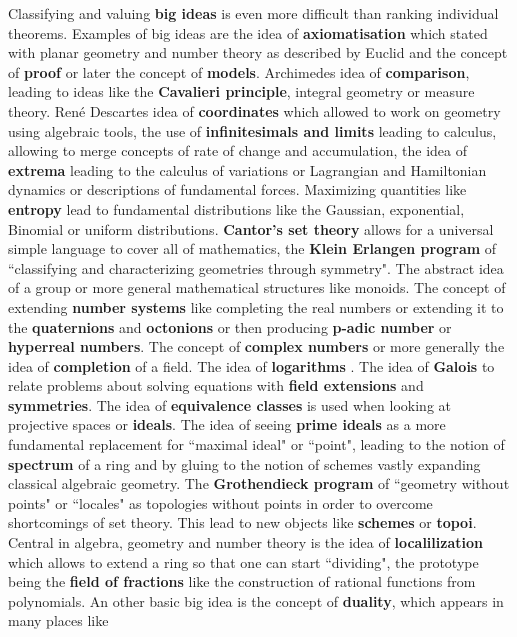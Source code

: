 \documentclass[12pt]{amsart}
\begin{document}
Classifying and valuing {\bf big ideas} is even more difficult than ranking individual
theorems. Examples of big ideas are the idea of {\bf axiomatisation} which stated with 
planar geometry and number theory as described by Euclid and the concept of {\bf proof} 
or later the concept of {\bf models}. 
Archimedes idea of {\bf comparison}, leading to ideas like the {\bf Cavalieri principle}, integral geometry 
or measure theory. Ren\'e Descartes idea of {\bf coordinates} which allowed to work on geometry using algebraic tools,
the use of {\bf infinitesimals and limits} leading to calculus, allowing to merge
concepts of rate of change and accumulation, the idea of {\bf extrema} leading to the calculus
of variations or Lagrangian and Hamiltonian dynamics or descriptions of fundamental forces. Maximizing quantities
like {\bf entropy} lead to fundamental distributions like the Gaussian, exponential, Binomial or uniform distributions. 
{\bf Cantor's set theory} allows for a universal
simple language to cover all of mathematics, the {\bf Klein Erlangen program} of 
``classifying and characterizing geometries through symmetry". The abstract idea of a group
or more general mathematical structures like monoids. The concept of extending {\bf number systems}
like completing the real numbers or extending it to the {\bf quaternions} and {\bf octonions} or then
producing {\bf p-adic number} or {\bf hyperreal numbers}. 
The concept of {\bf complex numbers} or more generally the idea of {\bf completion} of a field.
The idea of {\bf logarithms} \cite{StaudacherBuergi}.
The idea of {\bf Galois} to relate problems about solving equations with {\bf field extensions}
and {\bf symmetries}. The idea of {\bf equivalence classes} is used when looking at projective spaces
or {\bf ideals}. The idea of seeing {\bf prime ideals} as a more fundamental replacement for ``maximal ideal" or 
``point", leading to the notion of {\bf spectrum} of a ring and by gluing to the notion of schemes vastly expanding
classical algebraic geometry.  The {\bf Grothendieck program} of ``geometry without points" or ``locales" as topologies without points 
in order to overcome shortcomings of set theory. This lead to new objects like {\bf schemes} or {\bf topoi}. 
Central in algebra, geometry and number theory is the idea of {\bf localilization} which allows to extend a ring
so that one can start ``dividing", the prototype being the {\bf field of fractions} like the construction of rational functions
from polynomials. An other basic big idea is the concept of {\bf duality}, which appears in many places like 
\end{document}
